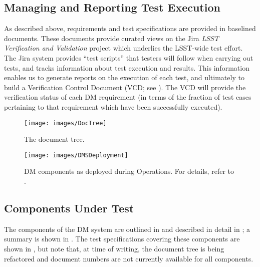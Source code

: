 \subsection{Managing and Reporting Test Execution}
\label{sect:reports}

As described above, requirements and test specifications are provided in baselined documents.
These documents provide curated views on the Jira \emph{LSST Verification and Validation} project which underlies the LSST-wide test effort.
The Jira system provides ``test scripts'' that testers will follow when carrying out tests, and tracks information about test execution and results.
This information enables us to generate reports on the execution of each test, and ultimately to build a Verification Control Document (VCD; see ).
The VCD will provide the verification status of each DM requirement (in terms of the fraction of test cases pertaining to that requirement which have been successfully executed).

\begin{figure}
\begin{center}
 \texttt{[image: images/DocTree]}

 \caption{The \product{} document tree.}
 \label{fig:doctree}

\end{center}
\end{figure}

\begin{figure}[htbp]
	\begin{center}
		\texttt{[image: images/DMSDeployment]}
		\caption{DM components as deployed during Operations. For details, refer to .
		\label{fig:dmsdeploy}}
	\end{center}
\end{figure}

\subsection{Components Under Test}
\label{sect:components}

The components of the DM system are outlined in  and described in detail in ; a summary is shown in .
The test specifications covering these components are shown in , but note that, at time of writing, the document tree is being refactored and document numbers are not currently available for all components.

